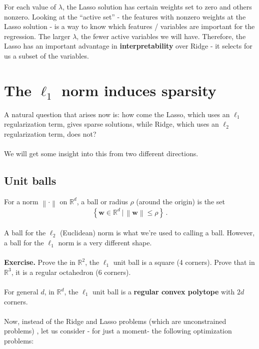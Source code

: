 \documentclass[11pt]{article}
\newcommand{\norm}[1]{\left\| #1\right\|}
\newcommand{\R}{\ensuremath{\mathbb{R}}}
\newcommand{\V}[1]{\mathbf{#1}}
\begin{document}
For each value of $\lambda$, the Lasso solution has certain weights set to zero
and others nonzero. Looking at the ``active set'' - the features with nonzero
weights at the Lasso solution - is a way to know which features / variables are
important for the regression. The larger $\lambda$, the fewer active variables
we will have. Therefore, the Lasso has an important advantage in {\bf
interpretability} over Ridge - it selects for us a subset of the variables.

\section{The $\ell_1$ norm induces sparsity}

A natural question that arises now is: how come the Lasso, which uses an $\ell_1$
regularization term, gives sparse solutions, while Ridge, which uses an $\ell_2$
regularization term, does not?
\\~\\
We will get some insight into this from two different directions.

\subsection{Unit balls}

For a norm $\norm{\cdot}$ on $\R^d$, a ball or radius $\rho$ (around the origin)
is the set
\[
  \left\{ \V{w}\in\R^d \,|\, \norm{\V{w}}\leq \rho \right\}\,.
\]
~\\
A ball for the $\ell_2$ (Euclidean) norm is what we're used to calling a ball.
However, a ball for the $\ell_1$ norm is a very different shape.
\\~\\
{\bf Exercise.} Prove the in $\R^2$, the $\ell_1$ unit ball is a square (4
corners). Prove
that in $\R^3$, it is a regular octahedron (6 corners). 
\\~\\
For general $d$, in $\R^d$, the $\ell_1$ unit ball is a  
{\bf regular convex polytope} with $2d$
corners.  
\\~\\
Now, instead of the Ridge and Lasso problems (which are unconstrained problems)
, let us consider - for just a moment- the following
optimization problems:
\end{document}

